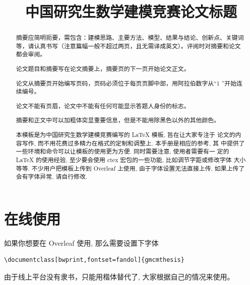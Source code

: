 \documentclass[bwprint]{gmcmthesis}
\title{中国研究生数学建模竞赛论文标题}
\begin{document}
 \maketitle

\begin{abstract}
摘要应简明扼要，需包含：建模思路、主要方法、模型、结果与结论、创新点、关键词等，请认真书写（注意篇幅一般不超过两页，且无需译成英文）。评阅时对摘要和论文都会审阅。

论文题目和摘要写在论文摘要上，摘要页的下一页开始论文正文。

论文从摘要页开始编写页码，页码必须位于每页页脚中部，用阿拉伯数字从“1 ”开始连续编号。

论文不能有页眉，论文中不能有任何可能显示答题人身份的标志。

摘要和正文中可以加粗体突显重要信息，但是不能用除黑色以外的其他颜色。

本模板是为中国研究生数学建模竞赛编写的 \LaTeX{} 模板, 旨在让大家专注于
论文的内容写作, 而不用花费过多精力在格式的定制和调整上. 本手册是相应的参考, 其
中提供了一些环境和命令可以让模板的使用更为方便. 同时需要注意, 使用者需要有一
定的 \LaTeX{} 的使用经验, 至少要会使用 ctex 宏包的一些功能, 比如调节字距或修改字体
大小等等. 不少用户把模板上传到 Overleaf 上使用, 由于字体设置无法直接上传, 如果上传了会有字体异常, 请自行修改. 






\end{abstract}

\pagestyle{plain}

\tableofcontents

\section{在线使用}

如果你想要在 Overleaf 使用, 那么需要设置下字体
\begin{lstlisting}[language={[latex]TeX}]
\documentclass[bwprint,fontset=fandol]{gmcmthesis}
\end{lstlisting}

由于线上平台没有隶书，只能用楷体替代了, 大家根据自己的情况来使用。

\end{document}
